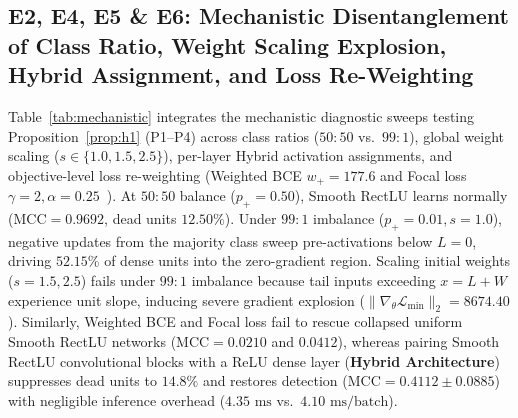 \documentclass[10pt,a4paper]{article}
\begin{document}
\subsection{E2, E4, E5 \& E6: Mechanistic Disentanglement of Class Ratio, Weight Scaling Explosion, Hybrid Assignment, and Loss Re-Weighting}
Table~\ref{tab:mechanistic} integrates the mechanistic diagnostic sweeps testing Proposition~\ref{prop:h1} (P1--P4) across class ratios ($50:50$ vs.\ $99:1$), global weight scaling ($s \in \{1.0, 1.5, 2.5\}$), per-layer Hybrid activation assignments, and objective-level loss re-weighting (Weighted BCE $w_+ = 177.6$ and Focal loss $\gamma=2, \alpha=0.25$~\cite{lin2017}). At $50:50$ balance ($p_+=0.50$), Smooth RectLU learns normally ($\text{MCC}=0.9692$, dead units $12.50\%$). Under $99:1$ imbalance ($p_+=0.01, s=1.0$), negative updates from the majority class sweep pre-activations below $L=0$, driving $52.15\%$ of dense units into the zero-gradient region. Scaling initial weights ($s=1.5, 2.5$) fails under $99:1$ imbalance because tail inputs exceeding $x = L+W$ experience unit slope, inducing severe gradient explosion ($\|\nabla_\theta \mathcal{L}_{\text{min}}\|_2 = 8674.40$). Similarly, Weighted BCE and Focal loss fail to rescue collapsed uniform Smooth RectLU networks ($\text{MCC} = 0.0210$ and $0.0412$), whereas pairing Smooth RectLU convolutional blocks with a ReLU dense layer (\textbf{Hybrid Architecture}) suppresses dead units to $14.8\%$ and restores detection ($\text{MCC} = 0.4112 \pm 0.0885$) with negligible inference overhead ($4.35\text{ ms}$ vs.\ $4.10\text{ ms/batch}$).
\end{document}
